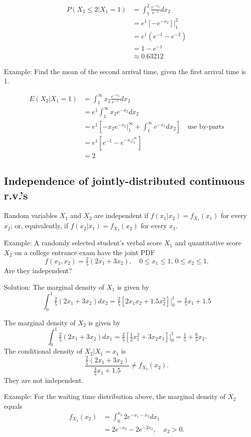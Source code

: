 \documentclass[
]{book}
\begin{document}
\begin{align*}
P(X_2\leq 2|X_1=1) &= \int_{1}^2 \frac{e^{-x_2}}{e^{-1}}dx_2\\
&= e^{1}[-e^{-x_2}]|_1^2\\
& = e^{1}(e^{-1}-e^{-2})\\
& = 1-e^{-1}\\
& \approx 0.63212
\end{align*}

Example: Find the mean of the second arrival time, given the first arrival time is 1.

\begin{align*}
E(X_2|X_1=1) &= \int_{1}^\infty x_2\frac{e^{-x_2}}{e^{-1}}dx_2\\
& = e^{1}\int_{1}^\infty x_2e^{-x_2}dx_2\\
& = e^1[-x_2e^{-x_2}|_1^\infty + \int_1^\infty e^{-x_2}dx_2] \quad \text{use by-parts}\\
& = e^1[e^{-1} - e^{-x_2|_1^\infty}]\\
& = 2
\end{align*}

\hypertarget{independence-of-jointly-distributed-continuous-r.v.s}{%
\subsection{Independence of jointly-distributed continuous r.v.'s}\label{independence-of-jointly-distributed-continuous-r.v.s}}

Random variables \(X_1\) and \(X_2\) are independent if \(f(x_1|x_2) = f_{X_1}(x_1)\) for every \(x_2\); or, equivalently, if \(f(x_2|x_1) = f_{X_2}(x_2)\) for every \(x_1\).

Example: A randomly selected student's verbal score \(X_1\) and quantitative score \(X_2\) on a college entrance exam have the joint PDF
\[f(x_1, x_2) = \tfrac25 (2x_1+3x_2), \quad 0\leq x_1\leq 1, \, 0\leq x_2\leq 1.\]
Are they independent?

Solution:
The marginal density of \(X_1\) is given by
\[\int_{0}^1 \tfrac25 (2x_1+3x_2)dx_2 = \tfrac25[2x_1x_2+1.5x_2^2]|_0^1 = \tfrac45 x_1 + 1.5\]

The marginal density of \(X_2\) is given by
\[\int_{0}^1 \tfrac25 (2x_1+3x_2)dx_1 = \tfrac25[\tfrac12x_1^2+3x_2x_1]|_0^1 = \tfrac15  + \tfrac65 x_2.\]
The conditional density of \(X_2|X_1=x_1\) is
\[\frac{\tfrac25(2x_1+3x_2)}{\tfrac45 x_1+1.5} \ne f_{X_2}(x_2).\]
They are not independent.

Example: For the waiting time distribution above, the marginal density of \(X_2\) equals
\begin{align*}
f_{X_2}(x_2) &= \int_0^{x_2} 2e^{-x_1-x_2}dx_1\\
& = 2e^{-x_2} - 2e^{-2x_2}, \quad x_2>0.
\end{align*}
\end{document}
